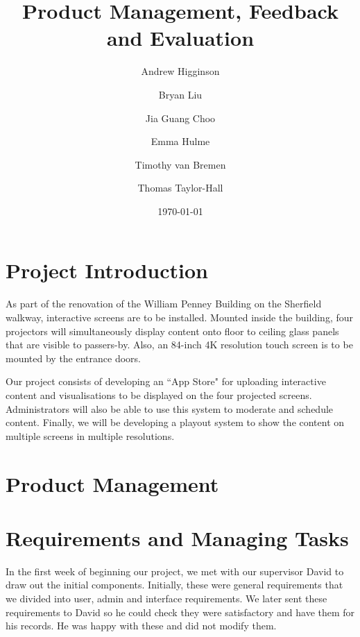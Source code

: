 \documentclass[a4paper]{article}
\begin{document}
\title{Product Management, Feedback and Evaluation}
\author{Andrew Higginson \and Bryan Liu \and Jia Guang Choo \and Emma Hulme \and 
Timothy van Bremen \and Thomas Taylor-Hall}
\date{\today}
\maketitle

\setcounter{table}{0}
\linespread{1.15}

\section{Project Introduction}
As part of the renovation of the William Penney Building on the Sherfield 
walkway, interactive screens are to be installed. Mounted inside the building,
four projectors will simultaneously display content onto floor to ceiling glass
panels that are visible to passers-by. Also, an 84-inch 4K resolution touch 
screen is to be mounted by the entrance doors. 

Our project consists of developing an ``App Store" for uploading interactive content and visualisations to be displayed on the four projected screens. Administrators will also be able to use this system to moderate and schedule content. Finally, we will be developing a playout system to show the content on multiple screens in multiple resolutions.

\section{Product Management}

\subsection{}


\subsection{}

\section{Requirements and Managing Tasks}
In the first week of beginning our project, we met with our supervisor 
David to draw out the initial components. Initially, these were general
requirements that we divided into user, admin and interface 
requirements. We later sent these requirements to David so he could check
they were satisfactory and have them for his records. He was happy with 
these and did not modify them.
\end{document}
